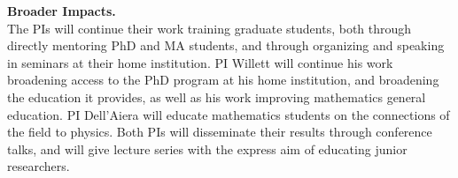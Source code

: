 \documentclass[11pt]{article}
\begin{document}
\noindent\textbf{Broader Impacts.}\\
The PIs will continue their work training graduate students, both through directly mentoring PhD and MA students, and through organizing and speaking in seminars at their home institution.  PI Willett will continue his work broadening access to the PhD program at his home institution, and broadening the education it provides, as well as his work improving mathematics general education.  PI Dell'Aiera will educate mathematics students on the connections of the field to physics.  Both PIs will disseminate their results through conference talks, and will give lecture series with the express aim of educating junior researchers.
\end{document}
